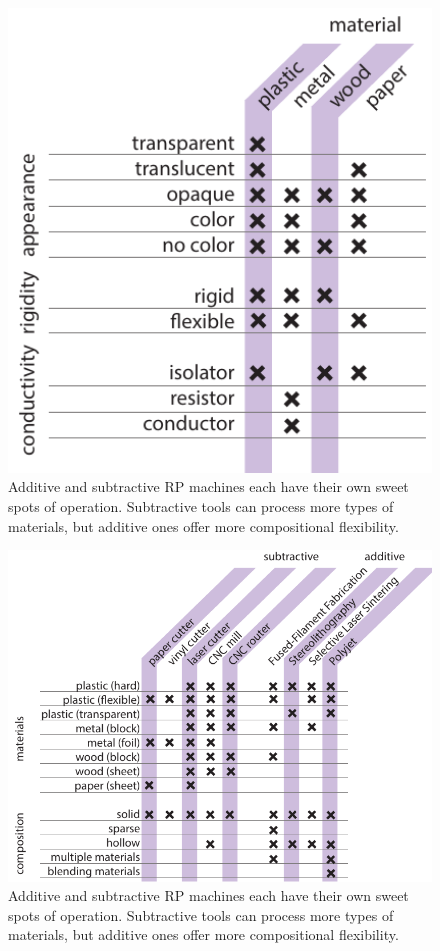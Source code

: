 \begin{figure}
\centering
\includegraphics[width=5in]{figures/fab-properties.pdf}
\caption{Additive and subtractive RP machines each have their own sweet spots of operation. Subtractive tools can process more types of materials, but additive ones offer more compositional flexibility.}
\label{table:fab-properties}
\end{figure}

\begin{figure}
\centering
\includegraphics[width=5in]{figures/materials-machines.pdf}
\caption{Additive and subtractive RP machines each have their own sweet spots of operation. Subtractive tools can process more types of materials, but additive ones offer more compositional flexibility.}
\label{table:materials-machines}
\end{figure}

